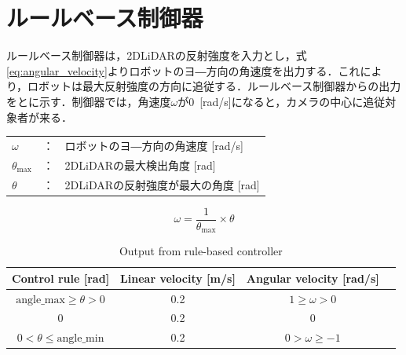 
\section{ルールベース制御器}
  ルールベース制御器は，2DLiDARの反射強度を入力とし，式\eqref{eq:angular_velocity}よりロボットのヨ―方向の角速度を出力する．これにより，ロボットは最大反射強度の方向に追従する．ルールベース制御器からの出力をとに示す．制御器では，角速度$\omega$が0 \,[rad/s]になると，カメラの中心に追従対象者が来る．

\vspace{-0.2cm}

  \begin{table}[!h]
    \centering
    \begin{tabular}{lcl}
        $\omega$ & ： & ロボットのヨ―方向の角速度 [rad/s] \\
        $\theta_{\text{max}}$ & ： & 2DLiDARの最大検出角度 [rad] \\
        $\theta$ & ： & 2DLiDARの反射強度が最大の角度 [rad] \\
    \end{tabular}
  \end{table}

\vspace{-0.7cm}

  \begin{equation}
      \omega = \frac{1}{\theta_{\text{max}}} \times \theta
      \label{eq:angular_velocity}
  \end{equation}

\vspace{-0.5cm}

  \begin{table}[h]
    \caption{Output from rule-based controller}
    \label{tab:output_from_rule-based_controller}
    \centering
    \begin{tabular}{cccc}
    \hline
    Control rule {[}rad{]} & Linear velocity {[}m/s{]} & Angular velocity {[}rad/s{]} \\ 
    \hline
    \hline
    $\text{angle\_max} \geq \theta > 0$ & 0.2 & $1 \geq \omega > 0$ \\ 
    $0$ & 0.2 & $0$ \\ 
    $0 < \theta \leq \text{angle\_min}$ & 0.2 & $0 > \omega \geq -1$ \\ 
    \hline
    \end{tabular}
  \end{table}

